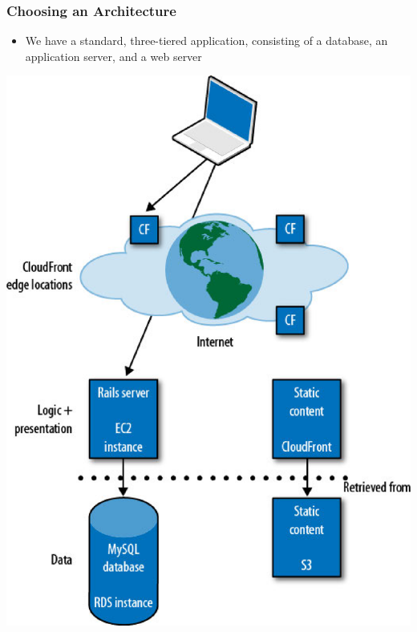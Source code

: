 \documentclass{beamer}
\begin{document}
\begin{frame}[fragile]
\frametitle{Choosing an Architecture}
\begin{itemize}
 \item We have a standard, three-tiered application, consisting of a database, an application server, and a web server
\end{itemize}
\begin{center}
\includegraphics[scale=0.20]{Programming_Amazon_EC2-013.eps}
\end{center}
\end{frame}
\end{document}
